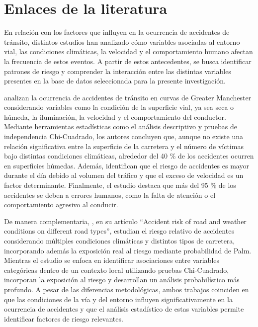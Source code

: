 \documentclass[12pt]{article}
\begin{document}
\begin{table}[H]
{\begin{tabular}{|p{2.5cm}|p{5cm}|p{4.5cm}|p{1cm}|p{3cm}|}
\end{tabular}
}
\end{table}

\section{Enlaces de la literatura}


En relación con los factores que influyen en la ocurrencia de accidentes de tránsito, distintos estudios han analizado cómo variables asociadas al entorno vial, las condiciones climáticas, la velocidad y el comportamiento humano afectan la frecuencia de estos eventos. A partir de estos antecedentes, se busca identificar patrones de riesgo y comprender la interacción entre las distintas variables presentes en la base de datos seleccionada para la presente investigación. 


\textcite{KARZAN2017} analizan la ocurrencia de accidentes de tránsito en curvas de Greater Manchester considerando variables como la condición de la superficie vial, ya sea seca o húmeda, la iluminación, la velocidad y el comportamiento del conductor. Mediante herramientas estadísticas como el análisis descriptivo y pruebas de independencia Chi-Cuadrado, los autores concluyen que, aunque no existe una relación significativa entre la superficie de la carretera y el número de víctimas bajo distintas condiciones climáticas, alrededor del 40 \% de los accidentes ocurren en superficies húmedas. Además, identifican que el riesgo de accidentes es mayor durante el día debido al volumen del tráfico y que el exceso de velocidad es un factor determinante. Finalmente, el estudio destaca que más del 95 \% de los accidentes se deben a errores humanos, como la falta de atención o el comportamiento agresivo al conducir.


De manera complementaria, \textcite{MALIN2019}, en su artículo “Accident risk of road and weather conditions on different road types”, estudian el riesgo relativo de accidentes considerando múltiples condiciones climáticas y distintos tipos de carretera, incorporando además la exposición real al riesgo mediante probabilidad de Palm. Mientras el estudio \textcite{KARZAN2017} se enfoca en identificar asociaciones entre variables categóricas dentro de un contexto local utilizando pruebas Chi-Cuadrado, \textcite{MALIN2019} incorporan la exposición al riesgo y desarrollan un análisis probabilístico más profundo. A pesar de las diferencias metodológicas, ambos trabajos coinciden en que las condiciones de la vía y del entorno influyen significativamente en la ocurrencia de accidentes y que el análisis estadístico de estas variables permite identificar factores de riesgo relevantes.
\end{document}
